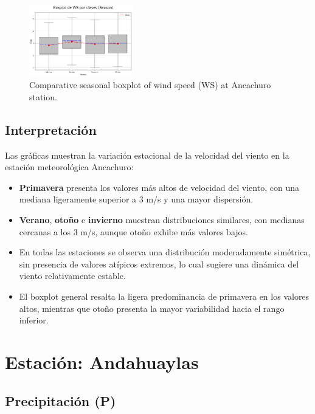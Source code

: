 \vspace{0.2cm}

\begin{figure}[H]
\centering
\includegraphics[width=0.4\textwidth]{resultados/por_estacion_del_anio/boxplot_clases_por_estacion/Ancachuro/WS_ClassBoxplot_Season.png}
\caption{Comparative seasonal boxplot of wind speed (WS) at Ancachuro station.}
\label{fig:ancachuro_ws_box}
\end{figure}

\subsection*{Interpretación}

Las gráficas muestran la variación estacional de la velocidad del viento en la estación meteorológica Ancachuro:

\begin{itemize}
    \item \textbf{Primavera} presenta los valores más altos de velocidad del viento, con una mediana ligeramente superior a 3 m/s y una mayor dispersión.
    \item \textbf{Verano}, \textbf{otoño} e \textbf{invierno} muestran distribuciones similares, con medianas cercanas a los 3 m/s, aunque otoño exhibe más valores bajos.
    \item En todas las estaciones se observa una distribución moderadamente simétrica, sin presencia de valores atípicos extremos, lo cual sugiere una dinámica del viento relativamente estable.
    \item El boxplot general resalta la ligera predominancia de primavera en los valores altos, mientras que otoño presenta la mayor variabilidad hacia el rango inferior.
\end{itemize}


\section{Estación: Andahuaylas}

\subsection{Precipitación (P)}

